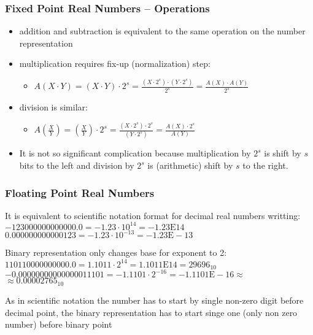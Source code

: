 \documentclass{beamer}
\begin{document}
\begin{frame}
\frametitle{Fixed Point Real Numbers -- Operations}

\begin{itemize}
\item addition and subtraction is equivalent to the same operation on the number representation
\item multiplication requires fix-up (normalization) step:
\begin{itemize}
\item $A(X \cdot Y) = (X \cdot Y ) \cdot 2^s = \frac{(X \cdot 2^s)\cdot( Y\cdot 2^s) }{2^s} = \frac{A(X) \cdot A(Y)}{2^s}$
\end{itemize}
\item division is similar:
\begin{itemize}
\item $A(\frac{X}{Y}) = (\frac{X}{Y}) \cdot 2^s = \frac{(X \cdot 2^s)\cdot2^s }{( Y\cdot 2^s)} = \frac{A(X) \cdot 2^s}{A(Y)}$
\end{itemize}
\item It is not so significant complication because multiplication by $2^s$ is shift by $s$ bits to the left and division by $2^s$ is (arithmetic) shift by $s$ to the right.
\end{itemize}



\end{frame}


\begin{frame}
\frametitle{Floating Point Real Numbers }

\bigskip

It is equivalent to scientific notation format for decimal real numbers writting:
$-123 000 000 000 000.0 = -1.23 \cdot 10^{14} = -1.23\text{E} 14$\\
$0.000 000 000 000 123 = -1.23 \cdot 10^{-13} = -1.23\text{E}-13$\\

\bigskip

Binary representation only changes base for exponent to 2:\\
$110 1100 0000 0000.0 = 1.1011 \cdot 2^{14} = 1.1011\text{E} 14 = 29696_{10}$\\
$-0.0000 0000 0000 0001 1101 = -1.1101 \cdot 2^{-16} = -1.1101\text{E}-16 \approx$\\
\phantom{xxxxxxxxxxxxxxxxxxxxxxxxxxxxxxxxxxxxxxxxxx}$\approx0.00002765_{10}$\\

\bigskip

As in scientific notation the number has to start by single non-zero digit before decimal point, the binary representation has to start singe one (only non zero number) before binary point


\end{frame}
\end{document}
